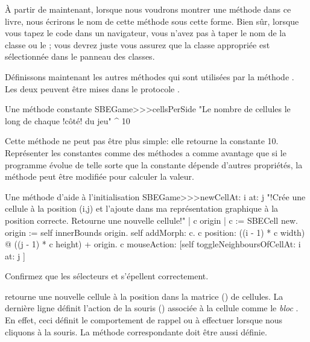 \documentclass[a4paper,10pt,twoside]{book}
\begin{document}
À partir de maintenant, lorsque nous voudrons montrer une méthode dans ce livre, nous écrirons le nom de cette méthode sous cette forme. Bien s\^ur, lorsque vous tapez le code dans un navigateur, vous n'avez pas à taper le nom de la classe ou le \ct{>>>}; vous devrez juste vous assurez que la classe appropriée est sélectionnée dans le panneau des classes.

Définissons maintenant les autres méthodes qui sont utilisées par la méthode . Les deux peuvent \^etre mises dans le protocole .

\begin{method}[sbegamecellsperside]{Une méthode constante}
SBEGame>>>cellsPerSide
   "Le nombre de cellules le long de chaque !c\^oté! du jeu"
   ^ 10
\end{method}

Cette méthode ne peut pas \^etre plus simple: elle retourne la constante
10. Représenter les constantes comme des méthodes a comme avantage que si le programme évolue de telle sorte que la constante dépende d'autres propriétés, la méthode peut \^etre modifiée pour calculer la valeur.

\begin{method}[newCellAt:at:]{Une méthode d'aide à l'initialisation}
SBEGame>>>newCellAt: i at: j
   "!Crée une cellule à la position (i,j) et l'ajoute dans ma représentation graphique à la position correcte. Retourne une nouvelle cellule!"
   | c origin |
   c := SBECell new.
   origin := self innerBounds origin.
   self addMorph: c.
   c position: ((i - 1) * c width) @ ((j - 1) * c height) + origin.
   c mouseAction: [self toggleNeighboursOfCellAt: i at: j ]
\end{method}

Confirmez que les sélecteurs  et  s'épellent correctement.

 retourne une nouvelle cellule  à la position  dans la matrice () de cellules.
La dernière ligne définit l'action de la souris () associée à la cellule comme le \emph{bloc}
\mbox{.}
En effet, ceci définit le comportement de rappel ou \callback à effectuer lorsque nous cliquons à la souris.
La méthode correspondante doit \^etre aussi définie.
\end{document}
